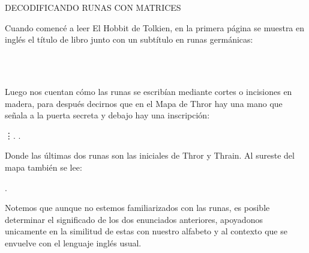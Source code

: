 \documentclass[12pt,a4paper]{article}
\begin{document}
\begin{center}
{\LARGE{DECODIFICANDO RUNAS CON MATRICES}}
\vspace{1cm}
\end{center}
Cuando comencé a leer El Hobbit de Tolkien, en la primera p\'agina se muestra en ingl\'es el t\'itulo de libro junto con un subt\'itulo en runas germ\'anicas:
\begin{center}
\vspace{0.5cm}
{\LARGE{  }}\\
{\large{}}\\
{\large{   }}
\end{center}
\vspace{0.5cm}

Luego nos cuentan c\'omo las runas se escrib\'ian mediante cortes o incisiones en madera, para despu\'es decirnos que en el Mapa de Thror hay una mano que señala a la puerta secreta y debajo hay una inscripci\'on:
\vspace{0.2cm}
\begin{center}
               \vdots  \textara{\th}. \textara{\th}.
\end{center}
\vspace{0.2cm}

Donde las \'ultimas dos runas son las iniciales de Thror y Thrain. Al sureste del mapa tambi\'en se lee:
\vspace{0.4cm}

                                              .
\vspace{0.4cm}

Notemos que aunque no estemos familiarizados con las runas, es posible determinar el significado de los dos enunciados anteriores, apoyadonos unicamente en la similitud de estas con nuestro alfabeto y al contexto que se envuelve con el lenguaje ingl\'es usual.
\end{document}
